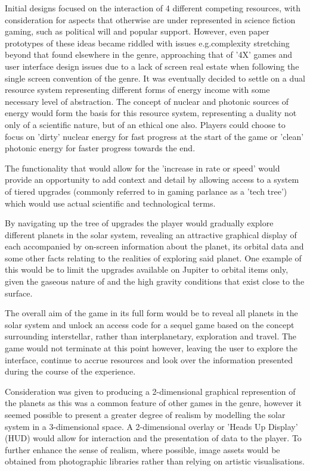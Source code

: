 \documentclass[twoside]{bhamthesis}
\begin{document}
Initial designs focused on the interaction of 4 different competing resources, with consideration for aspects that otherwise are under represented in science fiction gaming, such as political will and popular support. However, even paper prototypes of these ideas became riddled with issues e.g.complexity stretching beyond that found elsewhere in the genre, approaching that of '4X' games \cite{gunn_taxonomy_2009} and user interface design issues due to a lack of screen real estate when following the single screen convention of the genre. It was eventually decided to settle on a dual resource system representing different forms of energy income with some necessary level of abstraction. The concept of nuclear and photonic sources of energy would form the basis for this resource system, representing a duality not only of a scientific nature, but of an ethical one also. Players could choose to focus on 'dirty' nuclear energy for fast progress at the start of the game or 'clean' photonic energy for faster progress towards the end.

The functionality that would allow for the 'increase in rate or speed' would provide an opportunity to add context and detail by allowing access to a system of tiered upgrades (commonly referred to in gaming parlance as a 'tech tree') which would use actual scientific and technological terms.

By navigating up the tree of upgrades the player would gradually explore different planets in the solar system, revealing an attractive graphical display of each accompanied by on-screen information about the planet, its orbital data and some other facts relating to the realities of exploring said planet. One example of this would be to limit the upgrades available on Jupiter to orbital items only, given the gaseous nature of and the high gravity conditions that exist close to the surface.

The overall aim of the game in its full form would be to reveal all planets in the solar system and unlock an access code for a sequel game based on the concept surrounding interstellar, rather than interplanetary, exploration and travel. The game would not terminate at this point however, leaving the user to explore the interface, continue to accrue resources and look over the information presented during the course of the experience.

Consideration was given to producing a 2-dimensional graphical represention of the planets as this was a common feature of other games in the genre, however it seemed possible to present a greater degree of realism by modelling the solar system in a 3-dimensional space. A 2-dimensional overlay or 'Heads Up Display' (HUD) would allow for interaction and the presentation of data to the player. To further enhance the sense of realism, where possible, image assets would be obtained from photographic libraries rather than relying on artistic visualisations.
\end{document}
